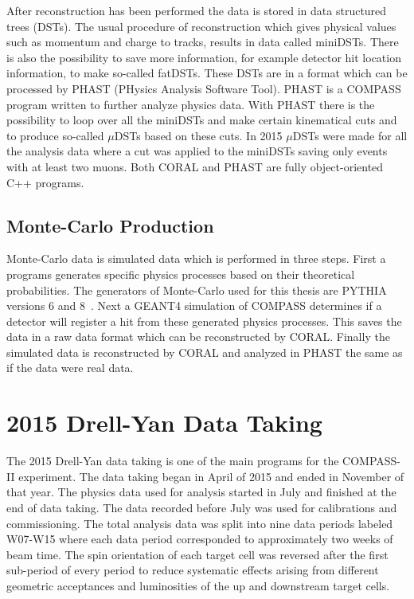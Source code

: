 After reconstruction has been performed the data is stored in data structured
trees (DSTs).  The usual procedure of reconstruction which gives physical values
such as momentum and charge to tracks, results in data called miniDSTs.  There
is also the possibility to save more information, for example detector hit
location information, to make so-called fatDSTs.  These DSTs are in a format
which can be processed by PHAST (PHysics Analysis Software Tool).  PHAST is a
COMPASS program written to further analyze physics data.  With PHAST there is
the possibility to loop over all the miniDSTs and make certain kinematical cuts
and to produce so-called $\mu$DSTs based on these cuts.  In 2015 $\mu$DSTs were
made for all the analysis data where a cut was applied to the miniDSTs saving
only events with at least two muons.  Both CORAL and PHAST are fully
object-oriented C++ programs. \par

\subsection{Monte-Carlo Production}
Monte-Carlo data is simulated data which is performed in three steps.  First a
programs generates specific physics processes based on their theoretical
probabilities.  The generators of Monte-Carlo used for this thesis are PYTHIA
versions 6 and 8~\cite{pythia}.  Next a GEANT4 simulation of COMPASS determines
if a detector will register a hit from these generated physics processes.  This
saves the data in a raw data format which can be reconstructed by CORAL.
Finally the simulated data is reconstructed by CORAL and analyzed in PHAST the
same as if the data were real data. \par


\section{2015 Drell-Yan Data Taking} \label{sec::compass_2015_dy_setup}
The 2015 Drell-Yan data taking is one of the main programs for the COMPASS-II
experiment.  The data taking began in April of 2015 and ended in November of
that year.  The physics data used for analysis started in July and finished at
the end of data taking.  The data recorded before July was used for calibrations
and commissioning.  The total analysis data was split into nine data periods
labeled W07-W15 where each data period corresponded to approximately two weeks
of beam time. The spin orientation of each target cell was reversed after the
first sub-period of every period to reduce systematic effects arising from
different geometric acceptances and luminosities of the up and downstream target
cells. \par

